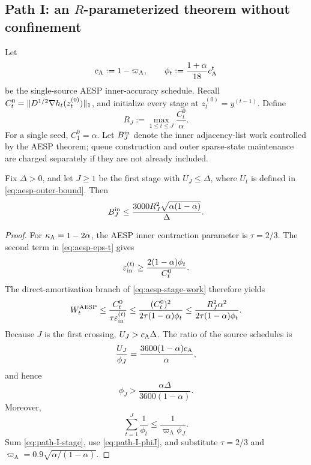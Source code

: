 \subsection{Path I: an $R$-parameterized theorem without confinement}
\label{subsec:path-I}

Let
\begin{equation}
  c_{\rm A}:=1-\varpi_{\mathrm A},
  \qquad
  \phi_t:=\frac{1+\alpha}{18}c_{\rm A}^t
  \label{eq:path-I-phi}
\end{equation}
be the single-source AESP inner-accuracy schedule.  Recall
$C_t^0=\lVert D^{1/2}\nabla h_t(z_t^{(0)})\rVert_1$, and initialize every stage at
$z_t^{(0)}=y^{(t-1)}$.  Define
\begin{equation}
  R_J:=\max_{1\leq t\leq J}\frac{C_t^0}{\alpha}.
  \label{eq:path-I-R}
\end{equation}
For a single seed, $C_1^0=\alpha$.  Let $B_J^{\rm in}$ denote the inner
adjacency-list work controlled by the AESP theorem; queue construction and
outer sparse-state maintenance are charged separately if they are not already
included.

\begin{proposition}
\label{prop:path-I-burnin}
Fix $\Delta>0$, and let $J\geq1$ be the first stage with $U_J\leq\Delta$,
where $U_t$ is defined in \cref{eq:aesp-outer-bound}.  Then
\begin{equation}
  B_J^{\rm in}
  \leq
  \frac{3000R_J^2\sqrt{\alpha(1-\alpha)}}{\Delta}.
  \label{eq:path-I-burnin}
\end{equation}
\end{proposition}

\begin{proof}
For $\kappa_{\rm A}=1-2\alpha$, the AESP inner contraction parameter is
$\tau=2/3$.
The second term in \cref{eq:aesp-eps-t} gives
\[
  \varepsilon_{\mathrm{in}}^{(t)}
  \geq
  \frac{2(1-\alpha)\phi_t}{C_t^0}.
\]
The direct-amortization branch of \cref{eq:aesp-stage-work} therefore yields
\begin{equation}
  W_t^{\rm AESP}
  \leq
  \frac{C_t^0}{\tau\varepsilon_{\mathrm{in}}^{(t)}}
  \leq
  \frac{(C_t^0)^2}{2\tau(1-\alpha)\phi_t}
  \leq
  \frac{R_J^2\alpha^2}{2\tau(1-\alpha)\phi_t}.
  \label{eq:path-I-stage}
\end{equation}
Because $J$ is the first crossing,
$U_J>c_{\rm A}\Delta$.  The ratio of the source schedules is
\[
  \frac{U_J}{\phi_J}
  =\frac{3600(1-\alpha)c_{\rm A}}{\alpha},
\]
and hence
\begin{equation}
  \phi_J>\frac{\alpha\Delta}{3600(1-\alpha)}.
  \label{eq:path-I-phiJ}
\end{equation}
Moreover,
\[
  \sum_{t=1}^J\frac1{\phi_t}
  \leq
  \frac1{\varpi_{\mathrm A}\phi_J}.
\]
Sum \cref{eq:path-I-stage}, use \cref{eq:path-I-phiJ}, and substitute
$\tau=2/3$ and
$\varpi_{\mathrm A}=0.9\sqrt{\alpha/(1-\alpha)}$.
\end{proof}

